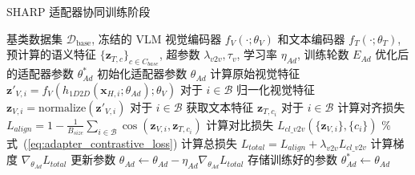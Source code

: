 \begin{algorithm}[htbp]
\caption{SHARP 适配器协同训练阶段} \label{alg:adapter_training_synergistic}
\begin{algorithmic}[1]
\REQUIRE 基类数据集 $\mathcal{D}_{\text{base}}$, 冻结的 VLM 视觉编码器 $f_V(\cdot; \theta_V)$ 和文本编码器 $f_T(\cdot; \theta_T)$, 预计算的语义特征 $\{\mathbf{z}_{T,c}\}_{c \in C_{base}}$, 超参数 $\lambda_{v2v}, \tau_v$, 学习率 $\eta_{Ad}$, 训练轮数 $E_{Ad}$
\ENSURE 优化后的适配器参数 $\theta_{Ad}^*$
\STATE 初始化适配器参数 $\theta_{Ad}$
        \STATE 计算原始视觉特征 $\mathbf{z}'_{V,i} = f_V(h_{1D2D}(\mathbf{x}_{H,i}; \theta_{Ad}); \theta_V)$ 对于 $i \in \mathcal{B}$
        \STATE 归一化视觉特征 $\mathbf{z}_{V,i} = \text{normalize}(\mathbf{z}'_{V,i})$ 对于 $i \in \mathcal{B}$
        \STATE 获取文本特征 $\mathbf{z}_{T,c_i}$ 对于 $i \in \mathcal{B}$
        \STATE 计算对齐损失 $L_{align} = 1 - \frac{1}{B_{size}} \sum_{i \in \mathcal{B}} \cos(\mathbf{z}_{V,i}, \mathbf{z}_{T,c_i})$
        \STATE 计算对比损失 $L_{cl\_v2v}(\{\mathbf{z}_{V,i}\}, \{c_i\})$ \% 式~(\ref{eq:adapter_contrastive_loss})
        \STATE 计算总损失 $L_{total} = L_{align} + \lambda_{v2v} L_{cl\_v2v}$
        \STATE 计算梯度 $\nabla_{\theta_{Ad}} L_{total}$
        \STATE 更新参数 $\theta_{Ad} \leftarrow \theta_{Ad} - \eta_{Ad} \nabla_{\theta_{Ad}} L_{total}$ %
    \ENDFOR %
\ENDFOR %
\STATE 存储训练好的参数 $\theta_{Ad}^* \leftarrow \theta_{Ad}$
\end{algorithmic}
\end{algorithm}

